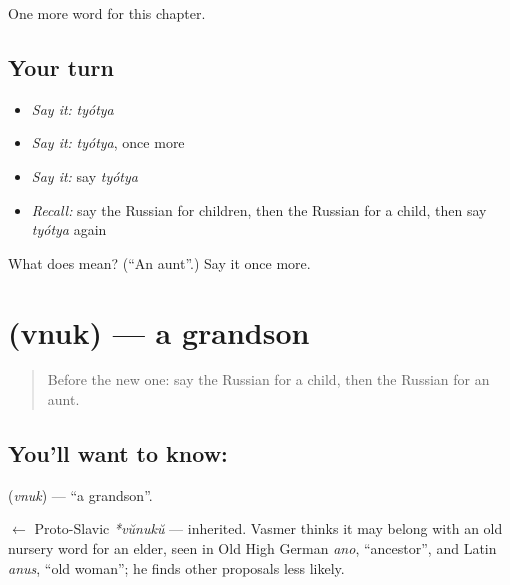 \begin{grammarlens}[title={What you've built}]
One more word for this chapter.
\end{grammarlens}

\subsection*{Your turn}
\begin{itemize}
\raggedright
  \item \emph{Say it:} \emph{tyótya}
  \item \emph{Say it:} \emph{tyótya}, once more
  \item \emph{Say it:} say \emph{tyótya}
  \item \emph{Recall:} say the Russian for children, then the Russian for a child, then say \emph{tyótya} again
\end{itemize}

\begin{tcolorbox}[breakable,colback=teal!4,colframe=teal!35!black,title={Before you move on}]
What does  mean? (\textquotedblleft{}An aunt\textquotedblright{}.) Say it once more.
\end{tcolorbox}
\section[\texorpdfstring{\ru{внук} (vnuk)}{внук (vnuk)}]{ (vnuk) — a grandson}

\label{lesson:RU-C36-grandson}



\begin{quote}
Before the new one: say the Russian for a child, then the Russian for an aunt.
\end{quote}

\subsection*{You'll want to know: }
\textbf{} (\emph{vnuk}) — \textquotedblleft{}a grandson\textquotedblright{}.

\begin{cousinweb}
\textbf{} $\leftarrow$ Proto-Slavic \emph{*vŭnukŭ} — inherited. Vasmer thinks it may belong with an old nursery word for an elder, seen in Old High German \emph{ano}, \textquotedblleft{}ancestor\textquotedblright{}, and Latin \emph{anus}, \textquotedblleft{}old woman\textquotedblright{}; he finds other proposals less likely.
\end{cousinweb}

